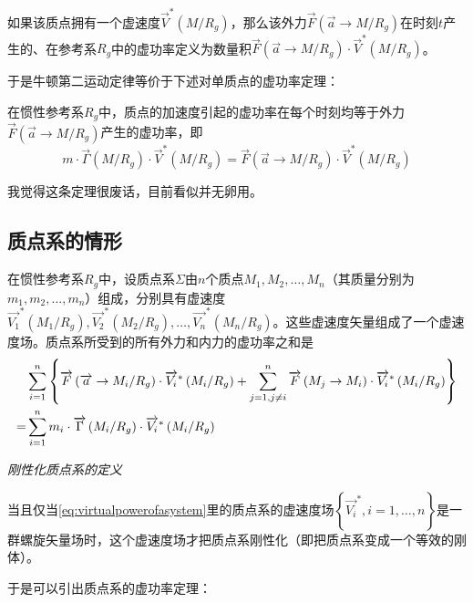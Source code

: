 \documentclass[UTF8]{ctexart}%
\begin{document}
如果该质点拥有一个虚速度$\overrightarrow{V}^{\ast}\left(M/R_g\right)$，那么该外力$\overrightarrow{F}\left(\overrightarrow{a}\rightarrow M/R_g\right)$在时刻$t$产生的、在参考系$R_g$中的虚功率定义为数量积$\overrightarrow{F}\left(\overrightarrow{a}\rightarrow M/R_g\right)\cdot \overrightarrow{V}^{\ast}\left(M/R_g\right)$。

于是牛顿第二运动定律等价于下述对单质点的虚功率定理：

在惯性参考系$R_g$中，质点的加速度引起的虚功率在每个时刻均等于外力$\overrightarrow{F}\left(\overrightarrow{a}\rightarrow M/R_g\right)$产生的虚功率，即
\begin{equation}
m\cdot\overrightarrow{\Gamma}\left(M/R_g\right)\cdot\overrightarrow{V}^{\ast}\left(M/R_g\right)=\overrightarrow{F}\left(\overrightarrow{a}\rightarrow M/R_g\right)\cdot\overrightarrow{V}^{\ast}\left(M/R_g\right)
\end{equation}

我觉得这条定理很废话，目前看似并无卵用。


\subsection{质点系的情形}
\label{sec:质点系的情形}
在惯性参考系$R_g$中，设质点系$\Sigma$由$n$个质点$M_1, M_2,\ldots,M_n$（其质量分别为$m_1, m_2,\ldots,m_n$）组成，分别具有虚速度$\overrightarrow{V_1}^{\ast}\left(M_1/R_g\right), \overrightarrow{V_2}^{\ast}\left(M_2/R_g\right),\ldots,\overrightarrow{V_n}^{\ast}\left(M_n/R_g\right)$。这些虚速度矢量组成了一个虚速度场。质点系所受到的所有外力和内力的虚功率之和是
\begin{align}
&\sum_{i=1}^n{\left\{ \overrightarrow{F}\left( \overrightarrow{a}\rightarrow M_i/R_g \right) \cdot \overrightarrow{V_i}^{\ast}\left( M_i/R_g \right) +\sum_{j=1,j\ne i}^n{\overrightarrow{F}\left( M_j\rightarrow M_i \right) \cdot \overrightarrow{V_i}^{\ast}\left( M_i/R_g \right)} \right\}}\notag \\
=&\sum_{i=1}^n{m_i\cdot \overrightarrow{\Gamma }\left( M_i/R_g \right)}\cdot \overrightarrow{V_i}^{\ast}\left( M_i/R_g \right)
\label{eq:virtualpowerofasystem}
\end{align}

\emph{刚性化质点系的定义}

当且仅当\cref{eq:virtualpowerofasystem}里的质点系的虚速度场$\left\{\overrightarrow{V_i}^{\ast},i=1,\ldots,n\right\}$是一群螺旋矢量场时，这个虚速度场才把质点系刚性化（即把质点系变成一个等效的刚体）。

于是可以引出质点系的虚功率定理：
\end{document}
